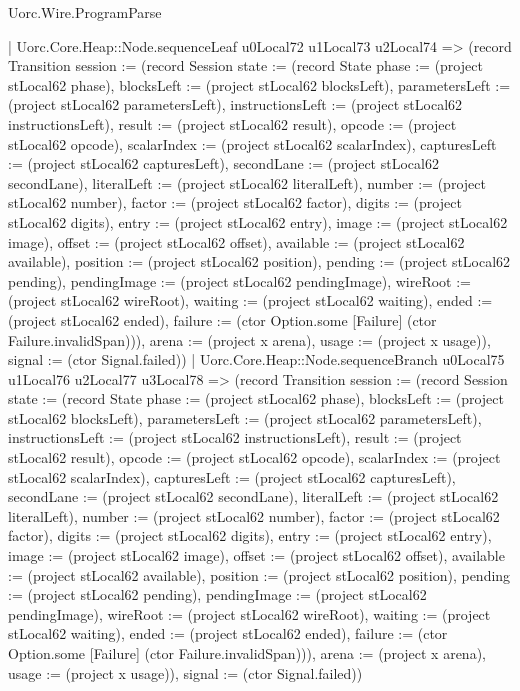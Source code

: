 \begin{lexlean}{Uorc.Wire.ProgramParse}
\begin{semanticmodule}
{        | Uorc.Core.Heap::Node.sequenceLeaf u0Local72 u1Local73 u2Local74 => (record Transition {session := (record Session {state := (record State {phase := (project stLocal62 phase), blocksLeft := (project stLocal62 blocksLeft), parametersLeft := (project stLocal62 parametersLeft), instructionsLeft := (project stLocal62 instructionsLeft), result := (project stLocal62 result), opcode := (project stLocal62 opcode), scalarIndex := (project stLocal62 scalarIndex), capturesLeft := (project stLocal62 capturesLeft), secondLane := (project stLocal62 secondLane), literalLeft := (project stLocal62 literalLeft), number := (project stLocal62 number), factor := (project stLocal62 factor), digits := (project stLocal62 digits), entry := (project stLocal62 entry), image := (project stLocal62 image), offset := (project stLocal62 offset), available := (project stLocal62 available), position := (project stLocal62 position), pending := (project stLocal62 pending), pendingImage := (project stLocal62 pendingImage), wireRoot := (project stLocal62 wireRoot), waiting := (project stLocal62 waiting), ended := (project stLocal62 ended), failure := (ctor Option.some [Failure] (ctor Failure.invalidSpan))}), arena := (project x arena), usage := (project x usage)}), signal := (ctor Signal.failed)})
        | Uorc.Core.Heap::Node.sequenceBranch u0Local75 u1Local76 u2Local77 u3Local78 => (record Transition {session := (record Session {state := (record State {phase := (project stLocal62 phase), blocksLeft := (project stLocal62 blocksLeft), parametersLeft := (project stLocal62 parametersLeft), instructionsLeft := (project stLocal62 instructionsLeft), result := (project stLocal62 result), opcode := (project stLocal62 opcode), scalarIndex := (project stLocal62 scalarIndex), capturesLeft := (project stLocal62 capturesLeft), secondLane := (project stLocal62 secondLane), literalLeft := (project stLocal62 literalLeft), number := (project stLocal62 number), factor := (project stLocal62 factor), digits := (project stLocal62 digits), entry := (project stLocal62 entry), image := (project stLocal62 image), offset := (project stLocal62 offset), available := (project stLocal62 available), position := (project stLocal62 position), pending := (project stLocal62 pending), pendingImage := (project stLocal62 pendingImage), wireRoot := (project stLocal62 wireRoot), waiting := (project stLocal62 waiting), ended := (project stLocal62 ended), failure := (ctor Option.some [Failure] (ctor Failure.invalidSpan))}), arena := (project x arena), usage := (project x usage)}), signal := (ctor Signal.failed)})
}
\end{semanticmodule}
\end{lexlean}
